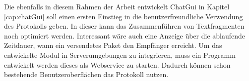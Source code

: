 Die ebenfalls in diesem Rahmen der Arbeit entwickelt ChatGui in Kapitel
\ref{cap:chatGui} soll einen ersten Einstieg in die benutzerfreundliche
Verwendung des Protokolls geben. In dieser kann das Zusammenführen von
Textfragmenten noch optimiert werden. Interessant wäre auch eine Anzeige
über die ablaufende Zeitdauer, wann ein versendetes Paket den Empfänger
erreicht. Um das entwickelte Modul in Serverumgebungen zu integrieren, muss ein
Programm entwickelt werden dieses als Webservice zu starten. Dadurch können
schon bestehende Benutzeroberflächen das Protokoll nutzen.
 


%
%


